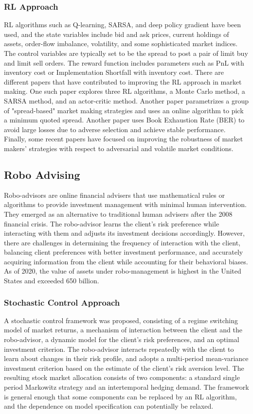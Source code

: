 \documentclass{article}
\begin{document}
\subsubsection{RL Approach}
RL algorithms such as Q-learning, SARSA, and deep policy gradient have been used, and the state variables include bid and ask prices, current holdings of assets, order-flow imbalance, volatility, and some sophisticated market indices. The control variables are typically set to be the spread to post a pair of limit buy and limit sell orders. The reward function includes parameters such as PnL with inventory cost or Implementation Shortfall with inventory cost. There are different papers that have contributed to improving the RL approach in market making. One such paper explores three RL algorithms, a Monte Carlo method, a SARSA method, and an actor-critic method. Another paper parametrizes a group of "spread-based" market making strategies and uses an online algorithm to pick a minimum quoted spread. Another paper uses Book Exhaustion Rate (BER) to avoid large losses due to adverse selection and achieve stable performance. Finally, some recent papers have focused on improving the robustness of market makers' strategies with respect to adversarial and volatile market conditions.

\subsection{Robo Advising}
Robo-advisors are online financial advisers that use mathematical rules or algorithms to provide investment management with minimal human intervention. They emerged as an alternative to traditional human advisers after the 2008 financial crisis. The robo-advisor learns the client's risk preference while interacting with them and adjusts its investment decisions accordingly. However, there are challenges in determining the frequency of interaction with the client, balancing client preferences with better investment performance, and accurately acquiring information from the client while accounting for their behavioral biases. As of 2020, the value of assets under robo-management is highest in the United States and exceeded 650 billion.

\subsubsection{Stochastic Control Approach}
A stochastic control framework was proposed, consisting of a regime switching model of market returns, a mechanism of interaction between the client and the robo-advisor, a dynamic model for the client's risk preferences, and an optimal investment criterion. The robo-advisor interacts repeatedly with the client to learn about changes in their risk profile, and adopts a multi-period mean-variance investment criterion based on the estimate of the client's risk aversion level. The resulting stock market allocation consists of two components: a standard single period Markowitz strategy and an intertemporal hedging demand. The framework is general enough that some components can be replaced by an RL algorithm, and the dependence on model specification can potentially be relaxed.
\end{document}
